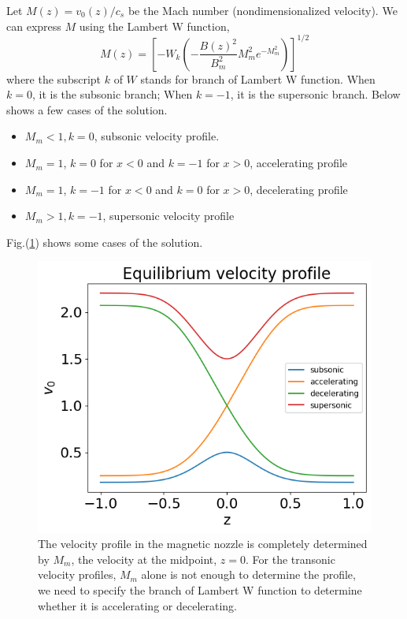 Let $M(z) = v_0(z)/c_s$ be the Mach number (nondimensionalized velocity). We can express $M$ using the Lambert W function,
\[ 
M(z) = \left[ -W_k\left(-\frac{B(z)^2}{B_m^2}M_m^2e^{-M_m^2}\right) \right]^{1/2} 
\]
where the subscript $k$ of $W$ stands for branch of Lambert W function. When $k=0$, it is the subsonic branch; When $k=-1$, it is the supersonic branch. Below shows a few cases of the solution.
\begin{itemize}
	\item $M_m < 1, k=0$, subsonic velocity profile.
	\item $M_m = 1$, $k=0$ for $x<0$ and $k=-1$ for $x>0$, accelerating profile
	\item $M_m = 1$, $k=-1$ for $x<0$ and $k=0$ for $x>0$, decelerating profile
	\item $M_m > 1, k=-1$, supersonic velocity profile
\end{itemize}
 Fig.(\ref{fig:velocity_profiles}) shows some cases of the solution.
\begin{figure}[H]
	\centering
	\includegraphics[width=0.7\linewidth]{figures/velocity-profiles}
	\caption{The velocity profile in the magnetic nozzle is completely determined by $M_m$, the velocity at the midpoint, $z=0$. For the transonic velocity profiles, $M_m$ alone is not enough to determine the profile, we need to specify the branch of Lambert W function to determine whether it is accelerating or decelerating.}
	\label{fig:velocity_profiles}
\end{figure}

